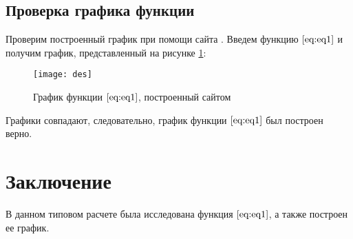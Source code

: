 \subsection{Проверка графика функции}
Проверим построенный график при помощи сайта \cite{desmos}. Введем функцию $\eqref{eq:eq1}$ и получим график, представленный на рисунке \ref{pic:des}:
\begin{figure}[H]
	\begin{center}
		\texttt{[image: des]}
		\caption{График функции $\eqref{eq:eq1}$, построенный сайтом}
		\label{pic:des} 
	\end{center}
\end{figure}
Графики совпадают, следовательно, график функции $\eqref{eq:eq1}$ был построен верно.
\newpage
\section*{Заключение}
В данном типовом расчете была исследована функция $\eqref{eq:eq1}$, а также построен ее график.
